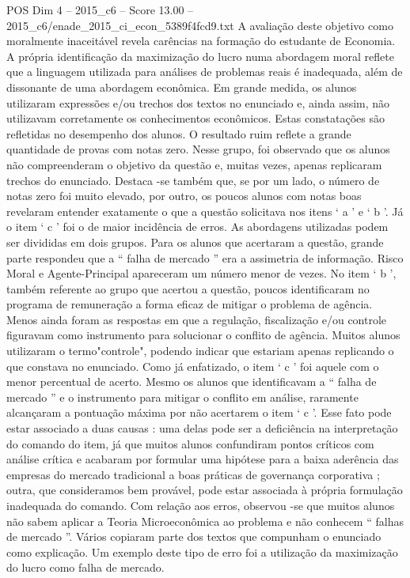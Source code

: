 \begin{textsample}{POS Dim 4 – 2015\_c6 – Score 13.00 – 2015\_c6/enade\_2015\_ci\_econ\_5389f4fcd9.txt}
A avaliação deste objetivo como moralmente inaceitável revela carências na formação do estudante de Economia.
A própria identificação da maximização do lucro numa abordagem moral reflete que a linguagem utilizada para análises de problemas reais é inadequada, além de dissonante de uma abordagem econômica.
Em grande medida, os alunos utilizaram expressões e/ou trechos dos textos no enunciado e, ainda assim, não utilizavam corretamente os conhecimentos econômicos.
Estas constatações são refletidas no desempenho dos alunos.
O resultado ruim reflete a grande quantidade de provas com notas zero.
Nesse grupo, foi observado que os alunos não compreenderam o objetivo da questão e, muitas vezes, apenas replicaram trechos do enunciado.
Destaca -se também que, se por um lado, o número de notas zero foi muito elevado, por outro, os poucos alunos com notas boas revelaram entender exatamente o que a questão solicitava nos itens ‘ a ’ e ‘ b ’.
Já o item ‘ c ’ foi o de maior incidência de erros.
As abordagens utilizadas podem ser divididas em dois grupos.
Para os alunos que acertaram a questão, grande parte respondeu que a “ falha de mercado ” era a assimetria de informação.
Risco Moral e Agente-Principal apareceram um número menor de vezes.
No item ‘ b ’, também referente ao grupo que acertou a questão, poucos identificaram no programa de remuneração a forma eficaz de mitigar o problema de agência.
Menos ainda foram as respostas em que a regulação, fiscalização e/ou controle figuravam como instrumento para solucionar o conflito de agência.
Muitos alunos utilizaram o termo"controle", podendo indicar que estariam apenas replicando o que constava no enunciado.
Como já enfatizado, o item ‘ c ’ foi aquele com o menor percentual de acerto.
Mesmo os alunos que identificavam a “ falha de mercado ” e o instrumento para mitigar o conflito em análise, raramente alcançaram a pontuação máxima por não acertarem o item ‘ c ’.
Esse fato pode estar associado a duas causas : uma delas pode ser a deficiência na interpretação do comando do item, já que muitos alunos confundiram pontos críticos com análise crítica e acabaram por formular uma hipótese para a baixa aderência das empresas do mercado tradicional a boas práticas de governança corporativa ; outra, que consideramos bem provável, pode estar associada à própria formulação inadequada do comando.
Com relação aos erros, observou -se que muitos alunos não sabem aplicar a Teoria Microeconômica ao problema e não conhecem “ falhas de mercado ”.
Vários copiaram parte dos textos que compunham o enunciado como explicação.
Um exemplo deste tipo de erro foi a utilização da maximização do lucro como falha de mercado.

\end{textsample}
